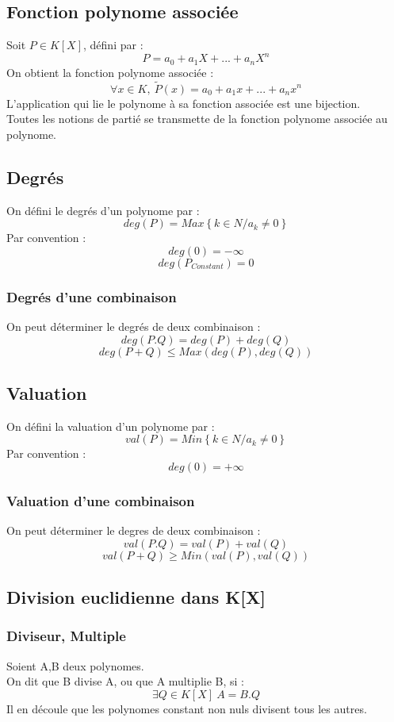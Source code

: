 \subsection{Fonction polynome associée}
Soit $P \in K[X]$, défini par :
$$P = a_0+a_1X+...+a_nX^n$$
On obtient la fonction polynome associée : 
$$\forall x \in K,~ \widetilde{P}(x) = a_0+a_1x+...+a_nx^n$$
L'application qui lie le polynome à sa fonction associée est une bijection.\\
Toutes les notions de partié se transmette de la fonction polynome associée au polynome.
\subsection{Degrés}
\begin{de}
On défini le degrés d'un polynome par :
$$deg(P) = Max\left\lbrace k\in N / a_k \neq 0\right\rbrace $$
Par convention : 
$$deg(0) = -\infty$$
$$deg(P_{Constant}) = 0$$
\end{de}
\subsubsection{Degrés d'une combinaison}
On peut déterminer le degrés de deux combinaison :
$$deg(P.Q) = deg(P) + deg(Q)$$
$$deg(P+Q) \leq Max(deg(P),deg(Q))$$
\subsection{Valuation}
\begin{de}
On défini la valuation d'un polynome par :
$$val(P) = Min\left\lbrace k\in N / a_k \neq 0\right\rbrace $$
Par convention : 
$$deg(0) = +\infty$$
\end{de}
\subsubsection{Valuation d'une combinaison}
On peut déterminer le degres de deux combinaison :
$$val(P.Q) = val(P) + val(Q)$$
$$val(P+Q) \geq Min(val(P),val(Q))$$
\subsection{Division euclidienne dans K[X]}
\subsubsection{Diviseur, Multiple}
\begin{de}
Soient A,B deux polynomes.\\
On dit que B divise A, ou que A multiplie B, si :
$$\exists Q\in K[X]~ A=B.Q$$
Il en découle que les polynomes constant non nuls divisent tous les autres.
\end{de}
